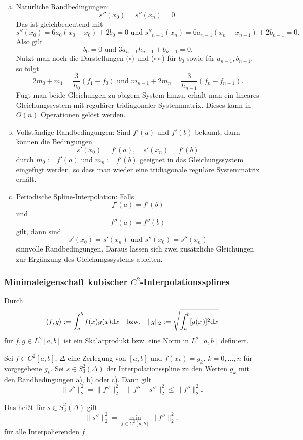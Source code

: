 \begin{enumerate}[a)]
 \item Natürliche Randbedingungen:
  \begin{equation}
   s''(x_0) = s''(x_n) = 0.
  \end{equation}
  Das ist gleichbedeutend mit
  \[ s''(x_0) = 6 a_0 (x_0 - x_0) + 2 b_0 = 0 \text{ und } s''_{n-1}(x_n) = 6 a_{n-1} (x_n - x_{n-1} ) + 2 b_{n-1} = 0.\]
  Also gilt
  \[ b_0 = 0 \text{ und } 3 a_{n-1} h_{n-1} + b_{n-1} = 0. \]
  Nutzt man noch die Darstellungen ($\circ$) und ($\circ\circ$) für $b_0$ sowie für $a_{n-1}, b_{n-1}$, so folgt
  \[ 2 m_0 + m_1 = \frac{3}{h_0}(f_1 - f_0) \text{ und } m_{n-1} + 2 m_n = \frac{3}{h_{n-1}} (f_n -f_{n-1}). \]
  Fügt man beide Gleichungen zu obigem System hinzu, erhält man ein lineares Gleichungssystem mit regulärer tridiagonaler Systemmatrix. Dieses kann in $O(n)$ Operationen gelöst werden.
 \item Vollständige Randbedingungen: Sind $f'(a)$ und $f'(b)$ bekannt, dann können die Bedingungen
  \begin{equation}
   s'(x_0) = f'(a), \quad s'(x_n) = f'(b)
  \end{equation}
  durch $m_0 := f'(a)$ und $m_n := f'(b)$ geeignet in das Gleichungssystem eingefügt werden, so dass man wieder eine tridiagonale reguläre Systemmatrix erhält.
 \item Periodische Spline-Interpolation: Falls
  \begin{equation}
   f'(a) = f'(b)
  \end{equation}
  und
  \[ f''(a) = f''(b) \]
  gilt, dann sind
  \begin{equation}
   s'(x_0) = s'(x_n) \text{ und } s''(x_0) = s''(x_n)
  \end{equation}
  sinnvolle Randbedingungen. Daraus lassen sich zwei zusätzliche Gleichungen zur Er\-gän\-zung des Gleichungssystems ableiten.
\end{enumerate}

\subsubsection{Minimaleigenschaft kubischer \texorpdfstring{$C^2$}{C2}-Interpolationssplines}
Durch
\[ \left\langle f, g \right\rangle := \int_a^b f(x) g(x) \mathrm{d} x \quad \text{bzw.} \quad \| g \|_2 := \sqrt{ \int_a^b [g(x)]^2 \mathrm{d} x } \]
für $f,g \in L^2[a,b]$ ist ein Skalarprodukt bzw. eine Norm in $L^2[a,b]$ definiert.

\begin{thm}
 Sei $f \in C^2[a,b]$, $\Delta$ eine Zerlegung von $[a,b]$ und $f(x_k) = g_k$, $k=0, \ldots, n$ für vorgegebene $g_k$. Sei $s \in S_3^2(\Delta)$ der Interpolationsspline zu den Werten $g_k$ mit den Randbedingungen a), b) oder c). Dann gilt
 \[ \| s'' \|^2_2 = \| f'' \|^2_2 - \| f'' - s'' \|^2_2 \le \| f'' \|^2_2. \]
\end{thm}
 Das heißt für $s \in S_3^2(\Delta)$ gilt
 \[ \| s'' \|^2_2 = \min_{f \in C^2[a,b]} \| f'' \|^2_2, \]
 für alle Interpolierenden $f$.

